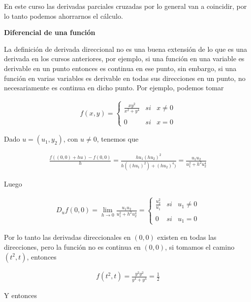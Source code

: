 \documentclass{article}
\theoremstyle{plain}
\theoremstyle{definition}
\begin{document}
En este curso las derivadas parciales cruzadas por lo general van a coincidir, por lo tanto podemos ahorrarnos el cálculo.



\newpage


\begin{center}
    \Large{\textbf{Diferencial de una función}}
\end{center}

La definición de derivada direccional no es una buena extensión de lo que es una derivada en los cursos anteriores, por ejemplo, si una función en una variable es derivable en un punto entonces es continua en ese punto, sin embargo, si una función en varias variables es derivable en todas sus direcciones en un punto, no necesariamente es continua en dicho punto. Por ejemplo, podemos tomar


\begin{align*}
f(x,y) = \left\{ \begin{array}{lcc} \frac{xy^2}{x^2+y^4} & si & x \neq 0 \\ \\ 0 & si & x =0 \end{array} \right.
\end{align*}

Dado $u=(u_1,y_2)$, con $u \neq 0$, tenemos que

\begin{align*}
    \frac{f((0,0)+hu)-f(0,0)}{h} = \frac{hu_1(hu_2)^2}{h((hu_1)^2)+(hu_2)^4)} = \frac{u_1u_2}{u_1^2+h^2u_2^4}
\end{align*}

Luego

\begin{align*}
    D_uf(0,0) = \lim_{h \to 0} \frac{u_1u_2}{u_1^2+h^2u_2^4} = \left\{ \begin{array}{lcc} \frac{u_2^2}{u_1} & si & u_1 \neq 0 \\ \\ 0 & si & u_1 =0 \end{array} \right.
\end{align*}

Por lo tanto las derivadas direccionales en  $(0,0)$ existen en todas las direcciones, pero la función no es continua en $(0,0)$, si tomamos el camino $(t^2, t)$, entonces

\begin{align*}
    f(t^2,t) = \frac{y^2y^2}{y^4+y^4} = \frac{1}{2}
\end{align*}

Y entonces
\end{document}
